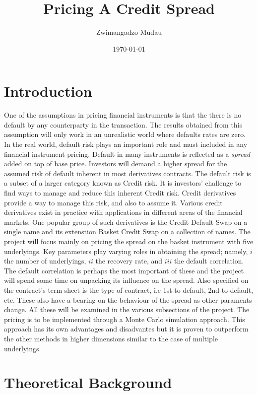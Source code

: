 \documentclass[a4paper,12pt]{article}
\begin{document}
\title{Pricing A Credit Spread}
\author{Zwimangadzo Mudau}
\date{\today}
\maketitle

\section{Introduction}
One of the assumptions in pricing financial instruments is that the there is no default by any counterparty in the transaction. The results obtained from this assumption will only work in an unrealistic world where defaults rates are zero. In the real world, default risk plays an important role and must included in any financial instrument pricing. Default in many instruments is reflected as a \textit{spread} added on top of base price. Investors will demand a higher spread for the assumed risk of default inherent in most derivatives contracts. The default risk is a subset of a larger category known as Credit risk. It is investors' challenge to find ways to manage and reduce this inherent Credit risk. Credit derivatives provide a way to manage this risk, and also to assume it. Various credit derivatives exist in practice with applications in different areas of the financial markets. One popular group of such derivatives is the Credit Default Swap on a single name and its extenstion Basket Credit Swap on a collection of names. The project will focus mainly on pricing the spread on the basket instrument with five underlyings. Key parameters play varying roles in obtaining the spread; namely, \(i\) the number of underlyings, \(ii\) the recovery rate, and \(iii\) the default correlation. The default correlation is perhaps the most important of these and the project will spend some time on unpacking its influence on the spread. Also specified on the contract's term sheet is the type of contract, i.e 1st-to-default, 2nd-to-default, etc. These also have a bearing on the behaviour of the spread as other paraments change. All these will be examined in the various subsections of the project. The pricing is to be implemented through a Monte Carlo simulation approach. This approach has its own advantages and disadvantes but it is proven to outperform the other methods in higher dimensions similar to the case of multiple underlyings. 

\section{Theoretical Background}
\end{document}
